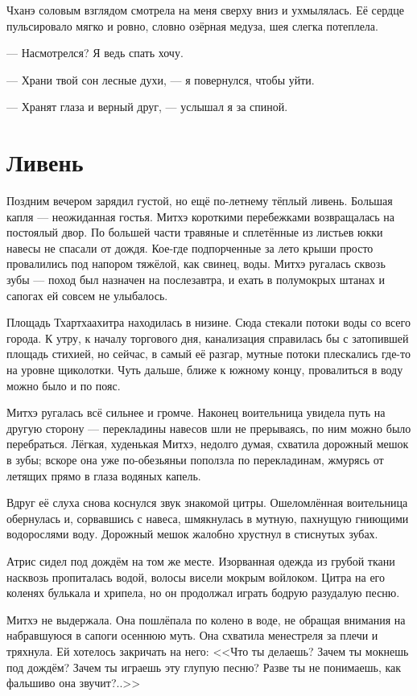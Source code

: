 Чханэ соловым взглядом смотрела на меня сверху вниз и ухмылялась.
Её сердце пульсировало мягко и ровно, словно озёрная медуза, шея слегка потеплела.

--- Насмотрелся?
Я ведь спать хочу.

--- Храни твой сон лесные духи, --- я повернулся, чтобы уйти.

--- Хранят глаза и верный друг, --- услышал я за спиной.

\section{Ливень}

Поздним вечером зарядил густой, но ещё по-летнему тёплый ливень.
Большая капля --- неожиданная гостья.
Митхэ короткими перебежками возвращалась на постоялый двор.
По большей части травяные и сплетённые из листьев юкки навесы не спасали от дождя.
Кое-где подпорченные за лето крыши просто провалились под напором тяжёлой, как свинец, воды.
Митхэ ругалась сквозь зубы --- поход был назначен на послезавтра, и ехать в полумокрых штанах и сапогах ей совсем не улыбалось.

Площадь Тхартхаахитра находилась в низине.
Сюда стекали потоки воды со всего города.
К утру, к началу торгового дня, канализация справилась бы с затопившей площадь стихией, но сейчас, в самый её разгар, мутные потоки плескались где-то на уровне щиколотки.
Чуть дальше, ближе к южному концу, провалиться в воду можно было и по пояс.

Митхэ ругалась всё сильнее и громче.
Наконец воительница увидела путь на другую сторону --- перекладины навесов шли не прерываясь, по ним можно было перебраться.
Лёгкая, худенькая Митхэ, недолго думая, схватила дорожный мешок в зубы;
вскоре она уже по-обезьяньи поползла по перекладинам, жмурясь от летящих прямо в глаза водяных капель.

Вдруг её слуха снова коснулся звук знакомой цитры.
Ошеломлённая воительница обернулась и, сорвавшись с навеса, шмякнулась в мутную, пахнущую гниющими водорослями воду.
Дорожный мешок жалобно хрустнул в стиснутых зубах.

Атрис сидел под дождём на том же месте.
Изорванная одежда из грубой ткани насквозь пропиталась водой, волосы висели мокрым войлоком.
Цитра на его коленях булькала и хрипела, но он продолжал играть бодрую разудалую песню.

Митхэ не выдержала.
Она пошлёпала по колено в воде, не обращая внимания на набравшуюся в сапоги осеннюю муть.
Она схватила менестреля за плечи и тряхнула.
Ей хотелось закричать на него:
<<Что ты делаешь?
Зачем ты мокнешь под дождём?
Зачем ты играешь эту глупую песню?
Разве ты не понимаешь, как фальшиво она звучит?..>>

